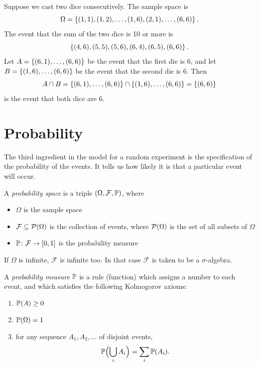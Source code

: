 \begin{example}\label{ex:two-dice-events}
Suppose we cast two dice consecutively. The sample space is
\[
  \Omega = \left\{ (1,1), (1,2), \ldots, (1,6), (2,1), \ldots, (6,6) \right\}.
\]
The event that the sum of the two dice is 10 or more is
\[
  \left\{ (4,6), (5,5), (5,6), (6,4), (6,5), (6,6) \right\}.
\]
Let $A = \left\{ (6,1), \ldots, (6,6) \right\}$ be the event that the first die is 6, and let $B = \left\{ (1,6), \ldots, (6,6) \right\}$ be the event that the second die is 6. Then
\[
  A \cap B = \left\{ (6,1), \ldots, (6,6) \right\} \cap \left\{ (1,6), \ldots, (6,6) \right\} = \left\{ (6,6) \right\}
\]
is the event that both dice are 6.
\end{example}

\section{Probability}\label{sec:probability}

The third ingredient in the model for a random experiment is the specification of the probability of the events. It tells us how likely it is that a particular event will occur.

\begin{definition}\label{def:probability-space}
A \emph{probability space} is a triple $(\Omega, \mathcal{F}, \mathbb{P})$, where
\begin{itemize}
  \item $\Omega$ is the sample space
  \item $\mathcal{F} \subseteq \mathcal{P}(\Omega)$ is the collection of events, where $\mathcal{P}(\Omega)$ is the set of all subsets of $\Omega$
  \item $\mathbb{P} \colon \mathcal{F} \to [0, 1]$ is the probability measure
\end{itemize}
\end{definition}

\begin{remark}
If $\Omega$ is infinite, $\mathcal{F}$ is infinite too. In that case $\mathcal{F}$ is taken to be a $\sigma$-algebra.
\end{remark}

\begin{definition}\label{def:probability-measure}
A \emph{probability measure} $\mathbb{P}$ is a rule (function) which assigns a number to each event, and which satisfies the following Kolmogorov axioms:
\begin{enumerate}[label=\textbf{Axiom \arabic*:}, leftmargin=*, widest=3]
  \item $\mathbb{P}(A) \ge 0$
  \item $\mathbb{P}(\Omega) = 1$
  \item for any sequence $A_1, A_2, \ldots$ of disjoint events,
  \[
    \mathbb{P}\Bigl(\bigcup_i A_i\Bigr) = \sum_i \mathbb{P}(A_i).
  \]
\end{enumerate}
\end{definition}

